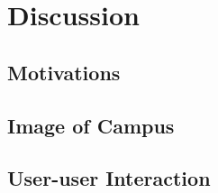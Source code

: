 \chapter{Discussion}\label{ch:6}

\section{Motivations}

\section{Image of Campus}

\section{User-user Interaction}

